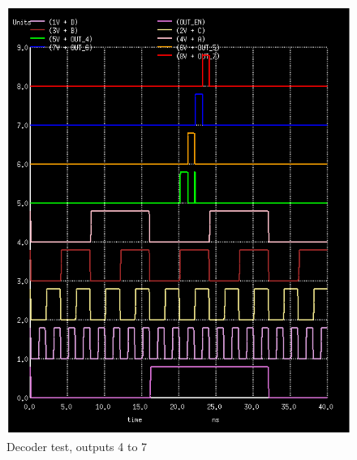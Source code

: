 \documentclass[12pt]{report}
\begin{document}
\begin{figure}[H]
  \centering
    \includegraphics[width=1.0\textwidth]{decoder_test_4_to_7.PNG}
  \caption{Decoder test, outputs 4 to 7}
  \label{fig:decoder_test_4_to_7}
\end{figure}
\end{document}

